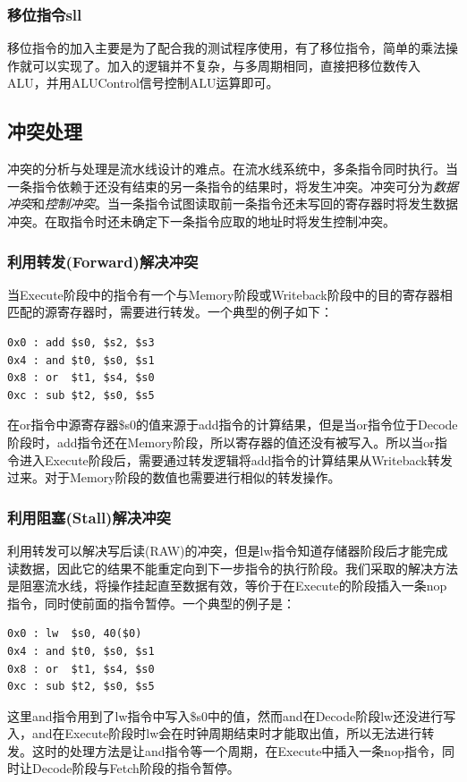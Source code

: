 \documentclass[12pt]{article} %
\begin{document}
\begin{sloppypar}
\subsubsection{移位指令sll}

移位指令的加入主要是为了配合我的测试程序使用，有了移位指令，简单的乘法操作就可以实现了。加入的逻辑并不复杂，与多周期相同，直接把移位数传入ALU，并用ALUControl信号控制ALU运算即可。



\subsection{冲突处理}

冲突的分析与处理是流水线设计的难点。在流水线系统中，多条指令同时执行。当一条指令依赖于还没有结束的另一条指令的结果时，将发生冲突。冲突可分为{\em 数据冲突}和{\em 控制冲突}。当一条指令试图读取前一条指令还未写回的寄存器时将发生数据冲突。在取指令时还未确定下一条指令应取的地址时将发生控制冲突。

\subsubsection{利用转发(Forward)解决冲突}

当Execute阶段中的指令有一个与Memory阶段或Writeback阶段中的目的寄存器相匹配的源寄存器时，需要进行转发。一个典型的例子如下：
\begin{lstlisting}
0x0 : add $s0, $s2, $s3
0x4 : and $t0, $s0, $s1
0x8 : or  $t1, $s4, $s0
0xc : sub $t2, $s0, $s5
\end{lstlisting}
在or指令中源寄存器\$s0的值来源于add指令的计算结果，但是当or指令位于Decode阶段时，add指令还在Memory阶段，所以寄存器的值还没有被写入。所以当or指令进入Execute阶段后，需要通过转发逻辑将add指令的计算结果从Writeback转发过来。对于Memory阶段的数值也需要进行相似的转发操作。

\subsubsection{利用阻塞(Stall)解决冲突}

利用转发可以解决写后读(RAW)的冲突，但是lw指令知道存储器阶段后才能完成读数据，因此它的结果不能重定向到下一步指令的执行阶段。我们采取的解决方法是阻塞流水线，将操作挂起直至数据有效，等价于在Execute的阶段插入一条nop指令，同时使前面的指令暂停。一个典型的例子是：
\begin{lstlisting}
0x0 : lw  $s0, 40($0)
0x4 : and $t0, $s0, $s1
0x8 : or  $t1, $s4, $s0
0xc : sub $t2, $s0, $s5
\end{lstlisting}
这里and指令用到了lw指令中写入\$s0中的值，然而and在Decode阶段lw还没进行写入，and在Execute阶段时lw会在时钟周期结束时才能取出值，所以无法进行转发。这时的处理方法是让and指令等一个周期，在Execute中插入一条nop指令，同时让Decode阶段与Fetch阶段的指令暂停。


\end{sloppypar}
\end{document}

